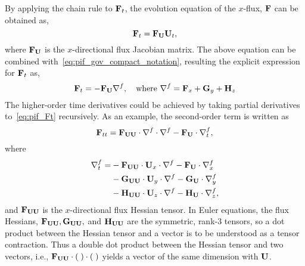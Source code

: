 By applying the chain rule to \( \mathbf{F}_{t} \),
the evolution equation of the \( x \)-flux, \( \mathbf{F} \) can be obtained as,
\begin{equation}\label{eq:flux_eqn}
    \mathbf{F}_{t} = \mathbf{F}_{\mathbf{U}} \mathbf{U}_{t},
\end{equation}
where \( \mathbf{F}_{\mathbf{U}} \) is the \( x \)-directional flux Jacobian matrix.
The above equation can be combined with~\cref{eq:pif_gov_compact_notation},
resulting the explicit expression for \( \mathbf{F}_{t} \) as,
\begin{equation}\label{eq:pif_Ft}
    \mathbf{F}_{t} = - \mathbf{F}_{\mathbf{U}} \nabla^{f}, \quad \text{where } \nabla^{f} = \mathbf{F}_{x} + \mathbf{G}_{y} + \mathbf{H}_{z}
\end{equation}
The higher-order time derivatives could be achieved by taking partial derivatives to~\cref{eq:pif_Ft} recursively.
As an example, the second-order term is written as
\begin{equation}\label{eq:pif_Ftt}
    \mathbf{F}_{tt} = \mathbf{F}_{\mathbf{U} \mathbf{U}} \cdot \nabla^{f} \cdot \nabla^{f} - \mathbf{F}_{\mathbf{U}} \cdot \nabla^{f}_{t},
\end{equation}
where
\begin{equation}\label{eq:pif_divt}
    \begin{split}
        \nabla^{f}_{t} =
            &-\mathbf{F}_{\mathbf{U} \mathbf{U}} \cdot \mathbf{U}_{x} \cdot \nabla^{f} - \mathbf{F}_{\mathbf{U}} \cdot \nabla^{f}_{x} \\
            &-\mathbf{G}_{\mathbf{U} \mathbf{U}} \cdot \mathbf{U}_{y} \cdot \nabla^{f} - \mathbf{G}_{\mathbf{U}} \cdot \nabla^{f}_{y} \\
            &-\mathbf{H}_{\mathbf{U} \mathbf{U}} \cdot \mathbf{U}_{z} \cdot \nabla^{f} - \mathbf{H}_{\mathbf{U}} \cdot \nabla^{f}_{z},
    \end{split}
\end{equation}
and \( \mathbf{F}_{\mathbf{U}\mathbf{U}} \) is the \( x \)-directional flux Hessian tensor.
In Euler equations, the flux Hessians, \( \mathbf{F}_{\mathbf{U}\mathbf{U}}, \mathbf{G}_{\mathbf{U}\mathbf{U}}, \) and \( \mathbf{H}_{\mathbf{U}\mathbf{U}} \)
are the symmetric, rank-3 tensors, so a dot product between the Hessian tensor and a vector
is to be understood as a tensor contraction.
Thus a double dot product between the Hessian tensor and two vectors,
i.e., \( \mathbf{F}_{\mathbf{U} \mathbf{U}} \cdot (\;) \cdot (\;) \) yields a vector of the same dimension with \( \mathbf{U} \).


